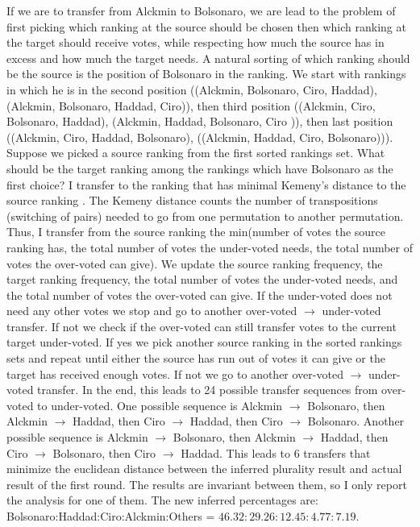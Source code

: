 \documentclass[hidelinks,11pt]{article}
\begin{document}
If we are to transfer from Alckmin to Bolsonaro, we are lead to the problem of
first picking which ranking at the source should be chosen then which ranking at
the target should receive votes, while respecting how much the source has in
excess and how much the target needs. A natural sorting of which ranking should
be the source is the position of Bolsonaro in the ranking. We start with
rankings in which he is in the second position ((Alckmin, Bolsonaro, Ciro,
Haddad), (Alckmin, Bolsonaro, Haddad, Ciro)), then third position ((Alckmin,
Ciro, Bolsonaro, Haddad), (Alckmin, Haddad, Bolsonaro, Ciro )), then last
position ((Alckmin, Ciro, Haddad, Bolsonaro), ((Alckmin, Haddad, Ciro,
Bolsonaro))). Suppose we picked a source ranking from the first sorted rankings
set. What should be the target ranking among the rankings which have Bolsonaro
as the first choice? I transfer to the ranking that has minimal Kemeny's
distance to the source ranking \parencite{nurmi2002voting}. The Kemeny distance
counts the number of transpositions (switching of pairs) needed to go from one
permutation to another permutation. Thus, I transfer from the source ranking the
min(number of votes the source ranking has, the total number of votes the
under-voted needs, the total number of votes the over-voted can give). We update
the source ranking frequency, the target ranking frequency, the total number of
votes the under-voted needs, and the total number of votes the over-voted can
give. If the under-voted does not need any other votes we stop and go to another
over-voted \(\to\) under-voted transfer. If not we check if the over-voted can
still transfer votes to the current target under-voted. If yes we pick another
source ranking in the sorted rankings sets and repeat until either the source
has run out of votes it can give or the target has received enough votes. If not
we go to another over-voted \(\to\) under-voted transfer. In the end, this leads
to 24 possible transfer sequences from over-voted to under-voted. One possible
sequence is Alckmin \(\to\) Bolsonaro, then Alckmin \(\to\) Haddad, then Ciro
\(\to\) Haddad, then Ciro \(\to\) Bolsonaro. Another possible sequence is
Alckmin \(\to\) Bolsonaro, then Alckmin \(\to\) Haddad, then Ciro \(\to\)
Bolsonaro, then Ciro \(\to\) Haddad. This leads to 6 transfers that minimize the
euclidean distance between the inferred plurality result and actual result of
the first round. The results are invariant between them, so I only report the
analysis for one of them. The new inferred percentages are:
Bolsonaro:Haddad:Ciro:Alckmin:Others = \(46.32:29.26:12.45:4.77:7.19 \).
\end{document}
